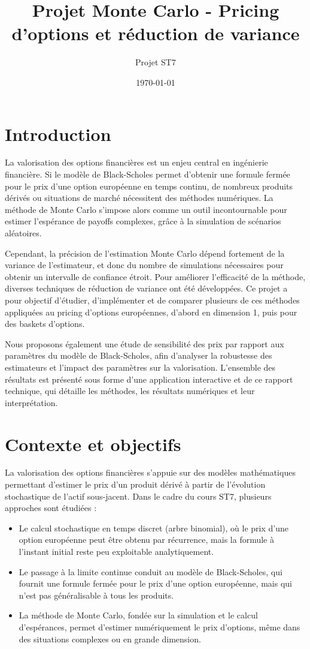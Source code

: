 ﻿\documentclass[11pt,a4paper]{article}
\title{Projet Monte Carlo - Pricing d'options et réduction de variance}
\author{Projet ST7}
\date{\today}
\begin{document}
\maketitle
\tableofcontents
\newpage
\section{Introduction}

La valorisation des options financières est un enjeu central en ingénierie financière. Si le modèle de Black-Scholes permet d'obtenir une formule fermée pour le prix d'une option européenne en temps continu, de nombreux produits dérivés ou situations de marché nécessitent des méthodes numériques. La méthode de Monte Carlo s'impose alors comme un outil incontournable pour estimer l'espérance de payoffs complexes, grâce à la simulation de scénarios aléatoires.

Cependant, la précision de l'estimation Monte Carlo dépend fortement de la variance de l'estimateur, et donc du nombre de simulations nécessaires pour obtenir un intervalle de confiance étroit. Pour améliorer l'efficacité de la méthode, diverses techniques de réduction de variance ont été développées. Ce projet a pour objectif d'étudier, d'implémenter et de comparer plusieurs de ces méthodes appliquées au pricing d'options européennes, d'abord en dimension 1, puis pour des baskets d'options.

Nous proposons également une étude de sensibilité des prix par rapport aux paramètres du modèle de Black-Scholes, afin d'analyser la robustesse des estimateurs et l'impact des paramètres sur la valorisation. L'ensemble des résultats est présenté sous forme d'une application interactive et de ce rapport technique, qui détaille les méthodes, les résultats numériques et leur interprétation.

\section{Contexte et objectifs}

La valorisation des options financières s'appuie sur des modèles mathématiques permettant d'estimer le prix d'un produit dérivé à partir de l'évolution stochastique de l'actif sous-jacent. Dans le cadre du cours ST7, plusieurs approches sont étudiées :

\begin{itemize}
    \item Le calcul stochastique en temps discret (arbre binomial), où le prix d'une option européenne peut être obtenu par récurrence, mais la formule à l'instant initial reste peu exploitable analytiquement.
    \item Le passage à la limite continue conduit au modèle de Black-Scholes, qui fournit une formule fermée pour le prix d'une option européenne, mais qui n'est pas généralisable à tous les produits.
    \item La méthode de Monte Carlo, fondée sur la simulation et le calcul d'espérances, permet d'estimer numériquement le prix d'options, même dans des situations complexes ou en grande dimension.
\end{itemize}
\end{document}
